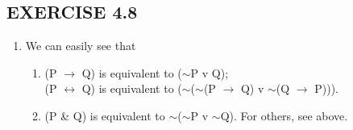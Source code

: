 \documentclass[a4paper,12pt]{article}
\newcommand{\ra}{$\rightarrow$ }
\newcommand{\lra}{$\leftrightarrow$ }
\newcommand{\s}{$\sim$}
\begin{document}
    \subsection*{EXERCISE 4.8}

    \begin{enumerate}[label=\arabic*,leftmargin=*]

        \item We can easily see that
            \begin{enumerate}[label=(\roman*)]
                \item (P \ra Q) is equivalent to (\s P v Q);\\
                    (P \lra Q) is equivalent to (\s (\s (P \ra Q) v \s (Q \ra P))).
                \item (P \& Q) is equivalent to \s (\s P v \s Q). For others, see above.
            \end{enumerate}


\end{enumerate}
\end{document}
